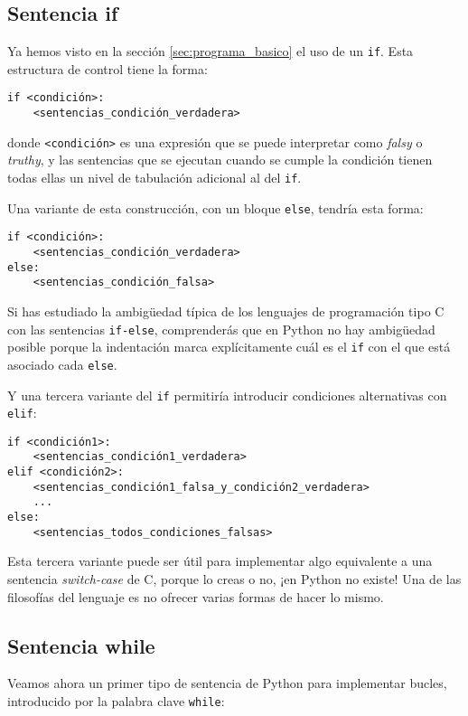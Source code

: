 \subsection{Sentencia if}

Ya hemos visto en la sección \ref{sec:programa_basico} el uso de un \texttt{if}. Esta estructura de control tiene la forma:

\begin{lstlisting}
if <condición>:
    <sentencias_condición_verdadera>
\end{lstlisting}

donde \texttt{<condición>} es una expresión que se puede interpretar como \emph{falsy} o \emph{truthy}, y las sentencias que se ejecutan cuando se cumple la condición tienen todas ellas un nivel de tabulación adicional al del \texttt{if}. 

Una variante de esta construcción, con un bloque \texttt{else}, tendría esta forma:

\begin{lstlisting}
if <condición>:
    <sentencias_condición_verdadera>
else:
    <sentencias_condición_falsa>
\end{lstlisting}

Si has estudiado la ambigüedad típica de los lenguajes de programación tipo C con las sentencias \texttt{if-else}, comprenderás que en Python no hay ambigüedad posible porque la indentación marca explícitamente cuál es el \texttt{if} con el que está asociado cada \texttt{else}.

Y una tercera variante del \texttt{if} permitiría introducir condiciones alternativas con \texttt{elif}:

\begin{lstlisting}
if <condición1>:
    <sentencias_condición1_verdadera>
elif <condición2>:
    <sentencias_condición1_falsa_y_condición2_verdadera>
	...
else:
    <sentencias_todos_condiciones_falsas>
\end{lstlisting}

Esta tercera variante puede ser útil para implementar algo equivalente a una sentencia \emph{switch-case} de C, porque lo creas o no, ¡en Python no existe! Una de las filosofías del lenguaje es no ofrecer varias formas de hacer lo mismo. 


\subsection{Sentencia while}

Veamos ahora un primer tipo de sentencia de Python para implementar bucles, introducido por la palabra clave \texttt{while}:

